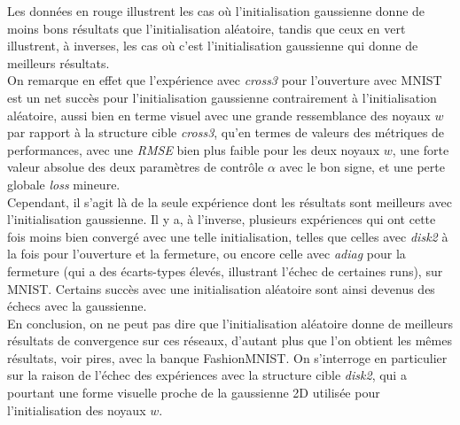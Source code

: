 \vspace{-2.0mm}
Les données en rouge illustrent les cas où l'initialisation gaussienne donne de moins bons résultats que l'initialisation aléatoire, tandis que ceux en vert illustrent, à inverses, les cas où c'est l'initialisation gaussienne qui donne de meilleurs résultats. \\ %

\vspace{-2.2mm}
\noindent On remarque en effet que l'expérience avec \textit{cross3} pour l'ouverture avec MNIST est un net succès pour l'initialisation gaussienne contrairement à l'initialisation aléatoire, aussi bien en terme visuel avec une grande ressemblance des noyaux $w$ par rapport à la structure cible \textit{cross3}, qu'en termes de valeurs des métriques de performances, avec une \textit{RMSE} bien plus faible pour les deux noyaux $w$, une forte valeur absolue des deux paramètres de contrôle $\alpha$ avec le bon signe, et une perte globale \textit{loss} mineure. \\

\vspace{-2.2mm}
\noindent Cependant, il s'agit là de la seule expérience dont les résultats sont meilleurs avec l'initialisation gaussienne. Il y a, à l'inverse, plusieurs expériences qui ont cette fois moins bien convergé avec une telle initialisation, telles que celles avec \textit{disk2} à la fois pour l'ouverture et la fermeture, ou encore celle avec \textit{adiag} pour la fermeture (qui a des écarts-types élevés, illustrant l'échec de certaines runs), sur MNIST. Certains succès avec une initialisation aléatoire sont ainsi devenus des échecs avec la gaussienne. \\

\vspace{-1.6mm}
En conclusion, on ne peut pas dire que l'initialisation aléatoire donne de meilleurs résultats de convergence sur ces réseaux, d'autant plus que l'on obtient les mêmes résultats, voir pires, avec la banque FashionMNIST. On s'interroge en particulier sur la raison de l'échec des expériences avec la structure cible \textit{disk2}, qui a pourtant une forme visuelle proche de la gaussienne 2D utilisée pour l'initialisation des noyaux $w$.
